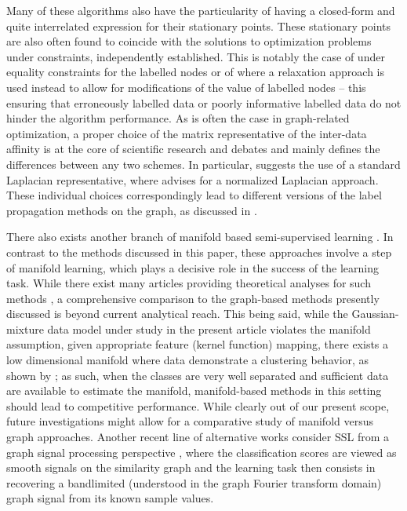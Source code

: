 \documentclass[twoside,11pt]{article}
\begin{document}
Many of these algorithms also have the particularity of having a closed-form and quite interrelated expression for their stationary points. These stationary points are also often found to coincide with the solutions to optimization problems under constraints, independently established. %
This is notably the case of \citet{zhu2003semi} under equality constraints for the labelled nodes or of \citet{belkin2004regularization} where a relaxation approach is used instead to allow for modifications of the value of labelled nodes -- this ensuring that erroneously labelled data or poorly informative labelled data do not hinder the algorithm performance. As is often the case in graph-related optimization, a proper choice of the matrix representative of the inter-data affinity is at the core of scientific research and debates and mainly defines the differences between any two schemes. In particular, \citet{joachims2003transductive} suggests the use of a standard Laplacian representative, where \citet{zhou2004learning} advises for a normalized Laplacian approach. These individual choices correspondingly lead to different versions of the label propagation methods on the graph, as discussed in \citet{avrachenkov2011generalized}. 

There also exists another branch of manifold based semi-supervised learning \citep{belkin2004semi, goldberg2009multi, moscovich2016minimax}. In contrast to the methods discussed in this paper, these approaches involve a step of manifold learning, which plays a decisive role in the success of the learning task. While there exist many articles providing theoretical analyses for such methods \citep{wasserman2008statistical, bickel2007local, moscovich2016minimax, globerson2017effective}, a comprehensive comparison to the graph-based methods presently discussed is beyond current analytical reach. This being said, while the Gaussian-mixture data model under study in the present article violates the manifold assumption, given appropriate feature (kernel function) mapping, there exists a low dimensional manifold where data demonstrate a clustering behavior, as shown by \citet{couillet2015kernel}; as such, when the classes are very well separated and sufficient data are available to estimate the manifold, manifold-based methods in this setting should lead to competitive performance. While clearly out of our present scope, future investigations might allow for a comparative study of manifold versus graph approaches. Another recent line of alternative works consider SSL from a graph signal processing perspective \citep{narang2013signal,narang2013localized,gadde2014active,anis2015asymptotic}, where the classification scores are viewed as smooth signals on the similarity graph and the learning task then consists in recovering a bandlimited (understood in the graph Fourier transform domain) graph signal from its known sample values.
\end{document}
